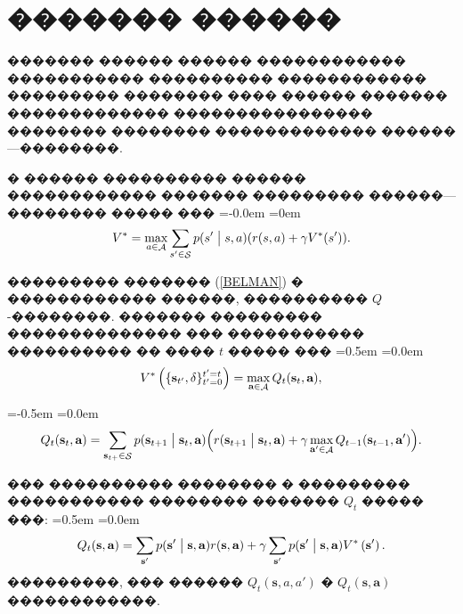 \documentclass[11pt]{ubs}
\DeclareMathOperator{\state}{\mathcal{S}}
\DeclareMathOperator{\action}{\mathcal{A}}
\begin{document}
\section{������� ������}
\label{par:MARL_solution}

������� ������ ������  ������������ ����������� ���������� ������������ ��������� �������� ���� ������ ������� ������������� ���������������� �������� �������� ������������� ������---��������.

\begin{proposition}\label{prep:kropt}
  \cite{My2} � ������ ���������� ������ ������������ ������� ��������� ������---�������� ����� ���
  {
  \abovedisplayskip=-0.0em
  \belowdisplayskip=0em
  \begin{equation}\label{BELMAN}
    V^* = \max_{a \in \action} \sum_{s'\in \state} p(s'\bigm|s, a)(r(s, a)+\gamma V^*(s')).
  \end{equation}}
\end{proposition}

��������� ������� (\ref{BELMAN}) � ������������ ������, ���������� $Q$-��������.
������� ��������� �������������� ��� ����������� ���������� �� ���� $t$ ����� ���
{\abovedisplayskip=0.5em
\belowdisplayskip=0.0em
\[
  V^*\left(\{\textbf{s}_{t'}, \delta \}_{t'=0}^{t'=t}\right)=\max\limits_{\textbf{a}\in{\cal \action}} Q_t(\textbf{s}_t, \textbf{a}),
\]}

{\abovedisplayskip=-0.5em
\belowdisplayskip=0.0em
\[
  Q_t(\textbf{s}_t, \textbf{a})  =    \sum\limits_{\textbf{s}_{t+}\in {\cal \state}} p(\textbf{s}_{t+1} \bigm|\textbf{s}_t,\textbf{a})\Bigl(r(\textbf{s}_{t+1} \bigm|\textbf{s}_t,\textbf{a})+\gamma \max\limits_{\textbf{a}' \in {\cal \action}}Q_{t-1}(\textbf{s}_{t-1},\textbf{a}') \Bigr).
\]
}

��� ���������� �������� � ��������� ����������� �������� ������� $Q_t$ ����� ���:
{
\abovedisplayskip=0.5em
\belowdisplayskip=0.0em
$$
  Q_t(\textbf{s},\textbf{a}) = \sum\limits_{\textbf{s}'} p(\textbf{s}'\bigm|\textbf{s}, \textbf{a})r(\textbf{s},\textbf{a}) + \gamma\sum\limits_{\textbf{s}'}p(\textbf{s}' \bigm| \textbf{s}, \textbf{a})
  V^*\left(\textbf{s}' \right).
$$}
\noindent
���������, ��� ������ $Q_t(\textbf{s},a,a')$ � $ Q_t(\textbf{s},\textbf{a})$ ������������.
\end{document}
